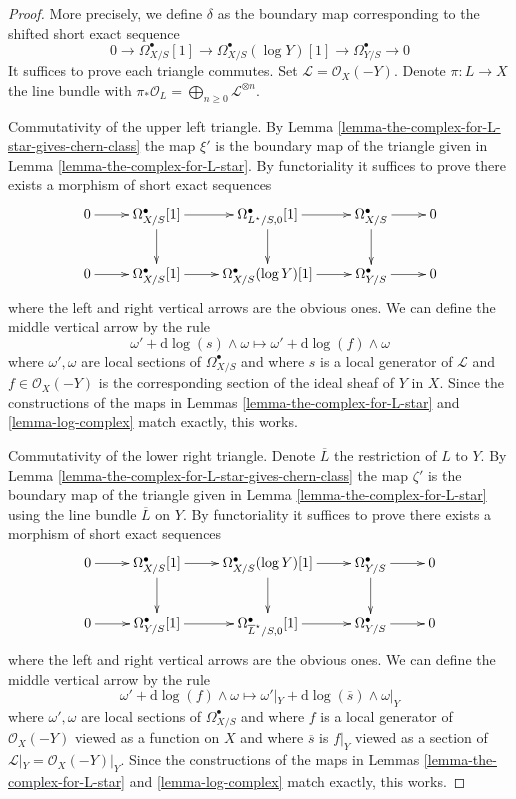 \begin{proof}
More precisely, we define $\delta$ as the boundary map corresponding to the
shifted short exact sequence
$$
0 \to \Omega^\bullet_{X/S}[1] \to
\Omega^\bullet_{X/S}(\log Y)[1] \to
\Omega^\bullet_{Y/S} \to 0
$$
It suffices to prove each triangle commutes. Set
$\mathcal{L} = \mathcal{O}_X(-Y)$. Denote $\pi : L \to X$ the line bundle
with $\pi_*\mathcal{O}_L = \bigoplus_{n \geq 0} \mathcal{L}^{\otimes n}$.

\medskip\noindent
Commutativity of the upper left triangle.
By Lemma \ref{lemma-the-complex-for-L-star-gives-chern-class}
the map $\xi'$ is the boundary map of the triangle given in
Lemma \ref{lemma-the-complex-for-L-star}.
By functoriality it suffices to prove there exists a morphism of
short exact sequences
$$
\xymatrix{
0 \ar[r] &
\Omega^\bullet_{X/S}[1] \ar[r] \ar[d] &
\Omega^\bullet_{L^\star/S, 0}[1] \ar[r] \ar[d] &
\Omega^\bullet_{X/S} \ar[r] \ar[d] &
0 \\
0 \ar[r] &
\Omega^\bullet_{X/S}[1] \ar[r] &
\Omega^\bullet_{X/S}(\log Y)[1] \ar[r] &
\Omega^\bullet_{Y/S} \ar[r] &
0
}
$$
where the left and right vertical arrows are the obvious ones.
We can define the middle vertical arrow by the rule
$$
\omega' + \text{d}\log(s) \wedge \omega \longmapsto
\omega' + \text{d}\log(f) \wedge \omega
$$
where $\omega', \omega$ are local sections of $\Omega^\bullet_{X/S}$
and where $s$ is a local generator of $\mathcal{L}$ and
$f \in \mathcal{O}_X(-Y)$ is the corresponding section of the ideal
sheaf of $Y$ in $X$. Since the constructions of the maps in
Lemmas \ref{lemma-the-complex-for-L-star} and \ref{lemma-log-complex}
match exactly, this works.

\medskip\noindent
Commutativity of the lower right triangle. Denote
$\overline{L}$ the restriction of $L$ to $Y$.
By Lemma \ref{lemma-the-complex-for-L-star-gives-chern-class}
the map $\zeta'$ is the boundary map of the triangle given in
Lemma \ref{lemma-the-complex-for-L-star} using the line bundle
$\overline{L}$ on $Y$.
By functoriality it suffices to prove there exists a morphism of
short exact sequences
$$
\xymatrix{
0 \ar[r] &
\Omega^\bullet_{X/S}[1] \ar[r] \ar[d] &
\Omega^\bullet_{X/S}(\log Y)[1] \ar[r] \ar[d] &
\Omega^\bullet_{Y/S} \ar[r] \ar[d] &
0 \\
0 \ar[r] &
\Omega^\bullet_{Y/S}[1] \ar[r] &
\Omega^\bullet_{\overline{L}^\star/S, 0}[1] \ar[r] &
\Omega^\bullet_{Y/S} \ar[r] &
0 \\
}
$$
where the left and right vertical arrows are the obvious ones.
We can define the middle vertical arrow by the rule
$$
\omega' + \text{d}\log(f) \wedge \omega \longmapsto
\omega'|_Y + \text{d}\log(\overline{s}) \wedge \omega|_Y
$$
where $\omega', \omega$ are local sections of $\Omega^\bullet_{X/S}$
and where $f$ is a local generator of $\mathcal{O}_X(-Y)$ viewed as
a function on $X$ and where $\overline{s}$ is $f|_Y$ viewed as a
section of $\mathcal{L}|_Y = \mathcal{O}_X(-Y)|_Y$.
Since the constructions of the maps in
Lemmas \ref{lemma-the-complex-for-L-star} and \ref{lemma-log-complex}
match exactly, this works.
\end{proof}

